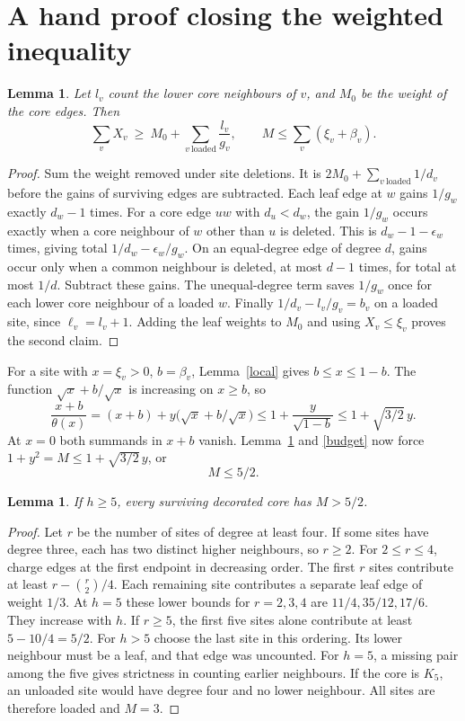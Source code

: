 \documentclass[11pt,a4paper]{article}
\newtheorem{lemma}[theorem]{Lemma}
\theoremstyle{remark}\newtheorem*{remark}{Remark}
\begin{document}
\section{A hand proof closing the weighted inequality}\label{sec:hand}
\begin{lemma}\label{saved}
Let $l_v$ count the lower \emph{core} neighbours of $v$, and $M_0$ be the weight of the core edges. Then
\[
 \sum_v X_v\ \ge\ M_0+\sum_{v\ \mathrm{loaded}}\frac{l_v}{g_v},
 \qquad M\le\sum_v(\xi_v+\beta_v).
\]
\end{lemma}
\begin{proof}
Sum the weight removed under site deletions. It is $2M_0+\sum_{v\ \mathrm{loaded}}1/d_v$ before the gains of surviving edges are subtracted. Each leaf edge at $w$ gains $1/g_w$ exactly $d_w-1$ times. For a core edge $uw$ with $d_u<d_w$, the gain $1/g_w$ occurs exactly when a core neighbour of $w$ other than $u$ is deleted. This is $d_w-1-\epsilon_w$ times, giving total $1/d_w-\epsilon_w/g_w$. On an equal-degree edge of degree $d$, gains occur only when a common neighbour is deleted, at most $d-1$ times, for total at most $1/d$. Subtract these gains. The unequal-degree term saves $1/g_w$ once for each lower core neighbour of a loaded $w$. Finally $1/d_v-l_v/g_v=b_v$ on a loaded site, since $\ell_v=l_v+1$. Adding the leaf weights to $M_0$ and using $X_v\le\xi_v$ proves the second claim.
\end{proof}
For a site with $x=\xi_v>0$, $b=\beta_v$, Lemma~\ref{local} gives $b\le x\le1-b$. The function $\sqrt{x}+b/\sqrt{x}$ is increasing on $x\ge b$, so
\[
 \frac{x+b}{\theta(x)}
   =(x+b)+y\bigl(\sqrt{x}+b/\sqrt{x}\bigr)
   \le1+\frac{y}{\sqrt{1-b}}\le1+\sqrt{3/2}\,y .
\]
At $x=0$ both summands in $x+b$ vanish. Lemma~\ref{saved} and \eqref{budget} now force $1+y^2=M\le1+\sqrt{3/2}\,y$, or
\begin{equation}M\le 5/2.\label{fivehalf}\end{equation}
\begin{lemma} If $h\ge5$, every surviving decorated core has $M>5/2$.\end{lemma}
\begin{proof}
Let $r$ be the number of sites of degree at least four. If some sites have degree three, each has two distinct higher neighbours, so $r\ge2$. For $2\le r\le4$, charge edges at the first endpoint in decreasing order. The first $r$ sites contribute at least $r-\binom r2/4$. Each remaining site contributes a separate leaf edge of weight $1/3$. At $h=5$ these lower bounds for $r=2,3,4$ are $11/4,35/12,17/6$. They increase with $h$. If $r\ge5$, the first five sites alone contribute at least $5-10/4=5/2$. For $h>5$ choose the last site in this ordering. Its lower neighbour must be a leaf, and that edge was uncounted. For $h=5$, a missing pair among the five gives strictness in counting earlier neighbours. If the core is $K_5$, an unloaded site would have degree four and no lower neighbour. All sites are therefore loaded and $M=3$.
\end{proof}
\end{document}
